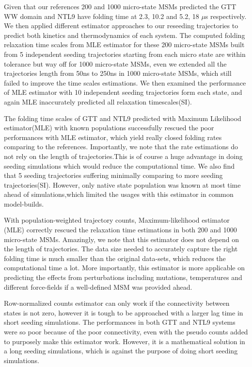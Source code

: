 \documentclass[%
 aip,
rsi,%
 amsmath,amssymb,
 reprint,%
]{revtex4-1}
\begin{document}
Given that our references 200 and 1000 micro-state MSMs predicted the GTT WW domain and NTL9 have folding time at 2.3, 10.2\cite{WAN:2016fz} and 5.2, 18 $\mu$s\cite{Schwantes:2013bpa,Baiz:2014gm} respectively. We then applied different estimator approaches to our reseeding trajectories to predict both kinetics and thermodynamics of each system. The computed folding relaxation time scales from MLE estimator for these 200 micro-state MSMs built from 5 independent seeding trajectories starting from each micro state are within tolerance but way off for 1000 micro-state MSMs, even we extended all the trajectories length from 50ns to 250ns in 1000 micro-state MSMs, which still failed to improve the time scales estimations. We then examined the performance of MLE estimator with 10 independent seeding trajectories form each state, and again MLE inaccurately predicted all relaxation timescales(SI). 

The folding time scales of GTT and NTL9 predicted with Maximum Likelihood estimator(MLE) with known populations successfully rescued the poor performances with MLE estimator, which yield really closed folding rates comparing to the references. Importantly, we note that the rate estimations do not rely on the length of trajectories.This is of course a huge advantage in doing seeding simulations which would reduce the computational time. We also find that 5 seeding trajectories suffering minimally comparing to more seeding trajectories(SI). However, only native state population was known at most time ahead of simulations,which limited the usages with this estimator in common model-builds.

With population-weighted trajectory counts, Maximum-likelihood estimator (MLE) correctly rescued the relaxation time estimations in both 200 and 1000 micro-state MSMs. Amazingly, we note that this estimator does not depend on the length of trajectories. The data size needed to accurately capture the right folding time is much smaller than the original data-sets, which reduces the computational time a lot. More importantly, this estimator is more applicable on predicting the effects from perturbations including mutations, temperatures and different force-fields if a well-defined MSM was provided ahead.

Row-normalized counts estimator can only work if the connectivity between states is not zero, however it is tough to be approached with a larger lag time in short seeding simulations. The performances in both GTT and NTL9 systems were so poor because of the poor connectivity, even with the pseudo counts added to purposely make this estimator work. However, it is a mathematical solution in a long seeding simulations, which is against the purpose of doing short seeding simulations. 
\end{document}
